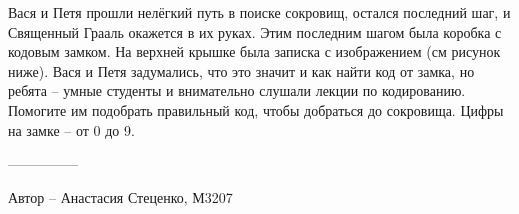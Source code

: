 \question
Вася и Петя прошли нелёгкий путь в поиске сокровищ, остался последний шаг, и Священный Грааль окажется в их руках. Этим последним шагом была коробка с кодовым замком. На верхней крышке была записка с изображением (см рисунок ниже). Вася и Петя задумались, что это значит и как найти код от замка, но ребята -- умные студенты и внимательно слушали лекции по кодированию. Помогите им подобрать правильный код, чтобы добраться до сокровища. Цифры на замке -- от 0 до 9.

\begin{figure}[h]

\begin{minipage}[h]{0.55\linewidth}
\end{minipage}
\begin{minipage}[h]{0.45\linewidth}
\end{minipage}
\end{figure}

---------------

Автор -- Анастасия Стеценко, М3207